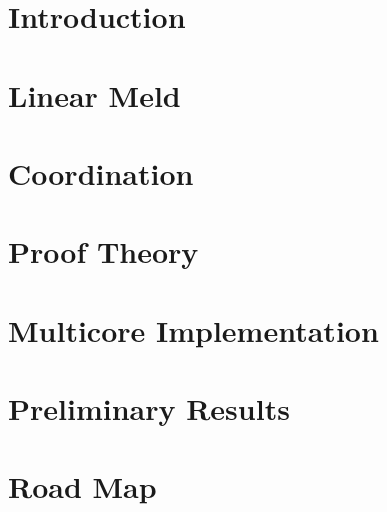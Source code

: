 \documentclass[12pt]{cmuthesis}
\begin{document}
\newcommand{\lang}[0]{LM }

\chapter{Introduction}


\chapter{Linear Meld}


\chapter{Coordination}\label{chapter:coordination}


\chapter{Proof Theory}


\chapter{Multicore Implementation}


\chapter{Preliminary Results}\label{chapter:exp}


\chapter{Road Map}


\appendix


\backmatter


\renewcommand{\bibsection}{\chapter{\bibname}}

\end{document}

